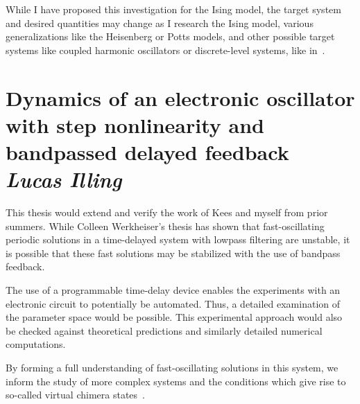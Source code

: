 \documentclass[11pt]{article} %
\renewcommand{\&}{}
\begin{document}
\begin{refsection}
While I have proposed this investigation for the Ising model, the target system
and desired quantities may change as I research the Ising model, various
generalizations like the Heisenberg or Potts models, and other possible target
systems like coupled harmonic oscillators or discrete-level systems, like
in~\cite{bhattacharyaUnderstandingDampingQuantum2012}.

\printbibliography[heading=subbibliography]%
\end{refsection}

\clearpage
\section{Dynamics of an electronic oscillator with step nonlinearity and bandpassed delayed feedback
\\ \large \emph{Lucas Illing}}

\begin{refsection}
This thesis would extend and verify the work of Kees and myself from prior
summers. While Colleen Werkheiser's thesis has shown that fast-oscillating
periodic solutions in a time-delayed system with lowpass filtering are unstable,
it is possible that these fast solutions may be stabilized with the use of
bandpass feedback.

The use of a programmable time-delay device enables the experiments with an
electronic circuit to potentially be automated. Thus, a detailed examination of
the parameter space would be possible. This experimental approach would also be
checked against theoretical predictions and similarly detailed numerical computations.

By forming a full understanding of fast-oscillating solutions in this system, we
inform the study of more complex systems and the conditions which give rise to
so-called virtual chimera states~\cite{largerVirtualChimeraStates2013}.

\printbibliography[heading=subbibliography]%
\end{refsection}
\end{document}
